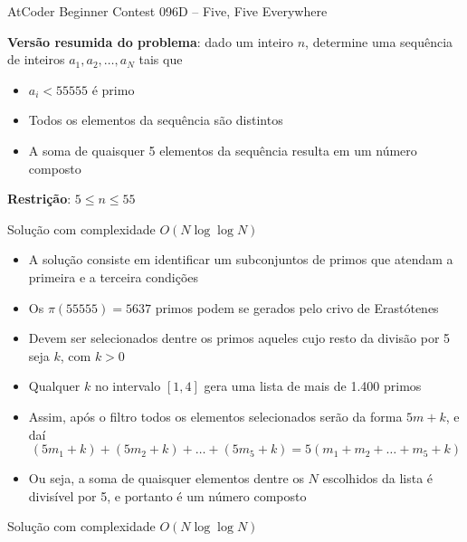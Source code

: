 \begin{frame}[fragile]{AtCoder Beginner Contest 096D -- Five, Five Everywhere}

    \textbf{Versão resumida do problema}: dado um inteiro $n$, determine uma sequência de inteiros
        $a_1, a_2, \ldots, a_N$ tais que

    \begin{itemize}
        \item $a_i < 55555$ é primo
        \item Todos os elementos da sequência são distintos
        \item A soma de quaisquer 5 elementos da sequência resulta em um número composto
    \end{itemize}

    \vspace{0.1in}
    \textbf{Restrição}: $5 \leq n \leq 55$

\end{frame}

\begin{frame}[fragile]{Solução com complexidade $O(N\log \log N)$}

    \begin{itemize}
        \item A solução consiste em identificar um subconjuntos de primos que atendam a primeira
            e a terceira condições

        \item Os $\pi(55555) = 5637$ primos podem se gerados pelo crivo de Erastótenes

        \item Devem ser selecionados dentre os primos aqueles cujo resto da divisão por 5 seja
            $k$, com $k > 0$

        \item Qualquer $k$ no intervalo $[1, 4]$ gera uma lista de mais de 1.400 primos

        \item Assim, após o filtro todos os elementos selecionados serão da forma $5m + k$, e 
            daí
        $$
            (5m_1 + k) + (5m_2 + k) + \ldots + (5m_5 + k) = 5(m_1 + m_2 + \ldots + m_5 + k)
        $$

        \item Ou seja, a soma de quaisquer elementos dentre os $N$ escolhidos da lista é 
            divisível por 5, e portanto é um número composto
    \end{itemize}

\end{frame}

\begin{frame}[fragile]{Solução com complexidade $O(N\log \log N)$}
\end{frame}
